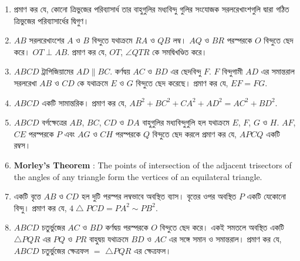 \documentclass[11pt, a4paper]{article}
\begin{document}
\begin{enumerate}
	\item \textbengali{প্রমাণ কর যে, কোনো ত্রিভুজের পরিব্যাসার্ধ তার বাহুগুলির মধ্যবিন্দু গুলির সংযোজক সরলরেখাংশগুলি দ্বারা গঠিত ত্রিভুজের পরিব্যাসার্ধের দ্বিগুণ।}
	
	\item $AB$ \textbengali{সরলরেখাংশের} $A$ \textbengali{ও} $B$ \textbengali{বিন্দুতে যথাক্রমে} $RA$ \textbengali{ও} $QB$ \textbengali{লম্ব।} $AQ$ \textbengali{ও} $BR$ \textbengali{পরস্পরকে} $O$ \textbengali{বিন্দুতে ছেদ করে।} $OT \perp AB$. \textbengali{প্রমাণ কর যে,} $OT$, $\angle QTR$ \textbengali{কে সমদ্বিখণ্ডিত করে।}
	
	\item $ABCD$ \textbengali{ট্রাপিজিয়ামের} $AD \parallel BC$. \textbengali{কর্ণদ্বয়} $AC$ \textbengali{ও} $BD$ \textbengali{এর ছেদবিন্দু} $F$. $F$ \textbengali{বিন্দুগামী} $AD$ \textbengali{এর সমান্তরাল সরলরেখা} $AB$ \textbengali{ও} $CD$ \textbengali{কে যথাক্রমে} $E$ \textbengali{ও} $G$ \textbengali{বিন্দুতে ছেদ করেছে। প্রমাণ কর যে,} $EF = FG$.
	
	\item $ABCD$ \textbengali{একটি সামান্তরিক। প্রমাণ কর যে,} $AB^2 + BC^2 + CA^2 + AD^2 = AC^2 + BD^2$.
	
	\item $ABCD$ \textbengali{বর্গক্ষেত্রের} $AB$, $BC$, $CD$ \textbengali{ও} $DA$ \textbengali{বাহুগুলির মধ্যবিন্দুগুলি হল যথাক্রমে} $E$, $F$, $G$ \textbengali{ও} $H$. $AF$, $CE$ \textbengali{পরস্পরকে} $P$ \textbengali{এবং} $AG$ \textbengali{ও} $CH$ \textbengali{পরস্পরকে} $Q$ \textbengali{বিন্দুতে ছেদ করলে প্রমাণ কর যে,} $APCQ$ \textbengali{একটি রম্বস।}
	
	\item \textbf{Morley's Theorem} : The points of intersection of the adjacent trisectors of the angles of any triangle form the vertices of an equilateral triangle.
	
	\item \textbengali{একটি বৃত্তে} $AB$ \textbengali{ও} $CD$ \textbengali{হল দুটি পরস্পর লম্বভাবে অবস্থিত ব্যাস। বৃত্তের ওপর অবস্থিত} $P$ \textbengali{একটি যেকোনো বিন্দু। প্রমাণ কর যে,} $4 \bigtriangleup PCD = PA^2 \sim PB^2$.
	
	\item $ABCD$ \textbengali{চতুর্ভুজের} $AC$ \textbengali{ও} $BD$ \textbengali{কর্ণদ্বয় পরস্পরকে} $O$ \textbengali{বিন্দুতে ছেদ করে। একই সমতলে অবস্থিত একটি} $\bigtriangleup PQR$ \textbengali{এর} $PQ$ \textbengali{ও} $PR$ \textbengali{বাহুদ্বয় যথাক্রমে} $BD$ \textbengali{ও} $AC$ \textbengali{এর সঙ্গে সমান ও সমান্তরাল। প্রমাণ কর যে,} $ABCD$ \textbengali{চতুর্ভুজের ক্ষেত্রফল} $=$ $\bigtriangleup PQR$ \textbengali{এর ক্ষেত্রফল।}
	

\end{enumerate}
\end{document}
